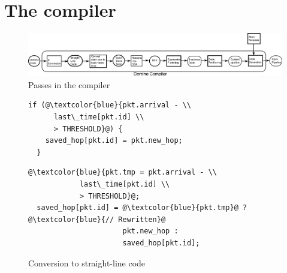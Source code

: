 \section{The \pktlanguage compiler}
\label{s:compiler}


\begin{figure}[!t]
  \includegraphics[width=\textwidth]{compiler.pdf}
  \caption{Passes in the \pktlanguage compiler}
\end{figure}

\begin{figure}[!t]
  \begin{minipage}{0.47\textwidth}
  \begin{small}
  \begin{lstlisting}[style=customc]
  if (@\textcolor{blue}{pkt.arrival - \\
      last\_time[pkt.id] \\
      > THRESHOLD}@) {
    saved_hop[pkt.id] = pkt.new_hop;
  }
  \end{lstlisting}
  \end{small}
  \end{minipage}
  \begin{minipage}{0.53\textwidth}
  \begin{small}
  \begin{lstlisting}[style=customc]
  @\textcolor{blue}{pkt.tmp = pkt.arrival - \\
            last\_time[pkt.id] \\
            > THRESHOLD}@;
  saved_hop[pkt.id] = @\textcolor{blue}{pkt.tmp}@ ? @\textcolor{blue}{// Rewritten}@
                      pkt.new_hop :
                      saved_hop[pkt.id];
  \end{lstlisting}
  \end{small}
  \end{minipage}
\caption{Conversion to straight-line code}
\label{fig:if_convert}
\end{figure}

